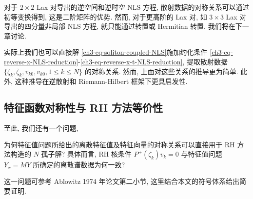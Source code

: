 对于 $2 \times 2 $ Lax 对导出的逆空间和逆时空 NLS 方程, 散射数据的对称关系可以通过初等变换得到, 这是二阶矩阵的优势. 然而, 对于更高阶的 Lax 对, 如 $3 \times 3$ Lax 对导出的四分量非局部 NLS 方程, 就只能通过转置或 Hermitian 转置, 我们将在下一章讨论.

\begin{remark}
    实际上我们也可以直接解 \eqref{ch3-eq-soliton-coupled-NLS}施加约化条件 \eqref{ch3-eq-reverse-x-NLS-reduction}-\eqref{ch3-eq-reverse-x-t-NLS-reduction}, 提取散射数据 $ \{\zeta_{k}, \bar{\zeta}_{k}, v_{k0}, \bar{v}_{k0}, 1 \leq k \leq N\} $ 的对称关系. 然而, 上面对这些关系的推导更为简单. 此外, 这种推导在逆散射和 Riemann-Hilbert 框架下更具启发性.
\end{remark}
\subsection{特征函数对称性与 RH 方法等价性}
至此, 我们还有一个问题,
\begin{problem}\label{ch3-question-RH-and-eigenvalue-problem}
为何特征值问题所给出的离散特征值及特征向量的对称关系可以直接用于 RH 方法构造的 $N$ 孤子解? 具体而言, RH 核条件 $P^{+}(\zeta_{k})v_{k} = 0$ 与特征值问题 $Y_{x} = MY$ 所确定的离散谱数据为何一致?
\end{problem}
这一问题可参考 Ablowitz 1974 年论文\cite{ablowitz1974a}第二小节, 这里结合本文的符号体系给出简要证明.
